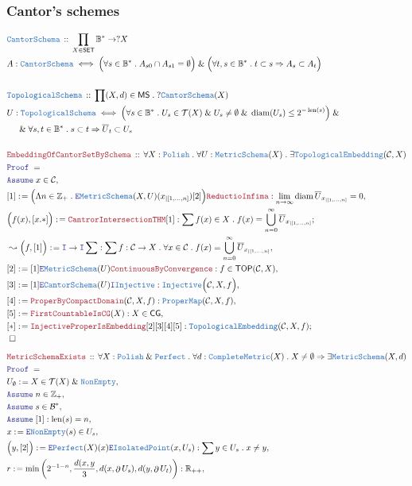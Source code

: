 \documentclass[12pt]{scrartcl}
\newcommand{\TYPE}[1]{\textcolor{NavyBlue}{\mathtt{#1}}}
\newcommand{\LOGIC}[1]{\textcolor{Blue}{\mathtt{#1}}}
\newcommand{\THM}[1]{\textcolor{Maroon}{\mathtt{#1}}}
\renewcommand{\.}{\; . \;}
\newcommand{\de}{: \kern 0.1pc =}
\newcommand{\Theorem}[2]{& \THM{#1} \, :: \, #2 \\ & \Proof = \\ }
\newcommand{\DeclareType}[2]{& \TYPE{#1} \, :: \, #2 \\}
\newcommand{\DefineType}[3]{& #1 : \TYPE{#2} \iff #3 \\}
\newcommand{\NewLine}{\\ & \kern 1pc}
\newcommand{\Page}[1]{ \begin{align*} #1 \end{align*}   }
\renewcommand{\And}{\; \& \;}
\newcommand{\Imply}{\Rightarrow}
\newcommand{\Intro}{\LOGIC{I}}
\newcommand{\Elim}{\LOGIC{E}}
\newcommand{\Int}{\mathbb{Z} }
\newcommand{\Reals}{\mathbb{R} }
\newcommand{\Say}[3]{& #1 \de #2 : #3, \\}
\newcommand{\SayIn}[3]{& #1 \de #2 \in #3, \\}
\newcommand{\Conclude}[3]{& #1 \de #2 : #3; \\}
\newcommand{\Derive}[3]{& \leadsto #1 \de #2 : #3, \\}
\newcommand{\Assume}[2]{& \LOGIC{Assume} \; #1 : #2, \\}
\newcommand{\AssumeIn}[2]{& \LOGIC{Assume} \; #1 \in #2, \\}
\newcommand{\QED}{\; \square}
\newcommand{\EndProof}{& \QED \\}
\newcommand{\Proof}{\LOGIC{Proof} \; }
\newcommand{\C}{\mathcal{C}}
\newcommand{\B}{\mathcal{B}}
\newcommand{\SET}{\mathsf{SET}}
\newcommand{\Perfect}{\TYPE{Perfect}}
\DeclareMathOperator*{\boundary}{\partial}
\newcommand{\TOP}{\mathsf{TOP}}
\newcommand{\CG}{\mathsf{CG}}
\newcommand{\T}{\mathcal{T}}
\DeclareMathOperator{\diam}{diam}
\newcommand{\MS}{\mathsf{MS}}
\newcommand{\Bool}{\mathbb{B}}
\newcommand{\FS}[1]{{#1}{}^*}
\newcommand{\Polish}{\TYPE{Polish}}
\DeclareMathOperator{\len}{len}
\newcommand{\inits}[2]{{#1}_{|\left[1,\ldots,#2\right]}}
\begin{document}
\subsubsection{Cantor's schemes}
\Page{
	\DeclareType{CantorSchema}{\prod_{X \in \SET} \FS{\Bool} \to ?X}
	\DefineType{A}{CantorSchema}{ \Big(\forall s \in \FS{\Bool} \. 
		A_{s0} \cap A_{s1} = \emptyset\Big) 
		\And   
		\Big(\forall t,s \in \FS{\Bool} \. t \subset s \Imply A_{s} \subset A_{t}\Big)
	}
	\\
	\DeclareType{TopologicalSchema}{\prod (X,d) \in \MS \. ?\TYPE{CantorSchema}(X)}
	\DefineType{U}{TopologicalSchema}
	{
		\Big(
			\forall s \in \FS{\Bool} \.
			U_s \in \T(X) \And U_s \neq \emptyset
			\And  \diam(U_s) \le 2^{-\len(s)} 
		\Big)
		\And
		\NewLine
		\And
		\forall s,t \in \FS{\Bool} \.
		s \subset t \Imply 
		\overline{U}_t \subset U_s
	}
	\\
	\Theorem{EmbeddingOfCantorSetBySchema}
	{
		\forall X : \Polish \.
		\forall U : \TYPE{MetricSchema}(X) \.
		\exists \TYPE{TopologicalEmbedding}(\C,X)
	}
	\AssumeIn{x}{\C}
	\Say{[1]}{
		\Big(
			\Lambda n \in \Int_+ \. 
			\Elim \TYPE{MetricSchema}(X,U)(\inits{x}{n})[2] 
		\Big)
		\THM{ReductioInfima}
	}
	{
		\lim_{n \to \infty} \diam \overline{U}_{\inits{x}{n}} = 0
	}
	\Conclude{\Big(f(x),[x.*]\Big)}{\THM{CantrorIntersectionTHM}[1]}  
	{
		\sum f(x) \in X \. f(x) = \bigcup^\infty_{n=0} \overline{U}_{\inits{x}{n}}
	}
	\Derive{\Big(f,[1]\Big)}{\Intro\to\Intro \sum}
	{
		\sum f : \C \to X \. 
		\forall x \in \C \.  
		f(x) = \bigcup^\infty_{n=0} \overline{U}_{\inits{x}{n}}
	}
	\Say{[2]}{[1] \Elim \TYPE{MetricSchema}(U)\THM{ContinuousByConvergence}}
	{
		f \in \TOP(\C,X)
	}
	\Say{[3]}{[1] \Elim \TYPE{CantorSchema}(U)\Intro \TYPE{Injective}}
	{
		\TYPE{Injective}\Big(\C,X, f\Big)
	}
	\Say{[4]}{\THM{ProperByCompactDomain}(\C,X,f)}{\TYPE{ProperMap}(\C,X,f)}
	\Say{[5]}{\THM{FirstCountableIsCG}(X)}{X \in \CG}
	\Conclude{[*]}{\THM{InjectiveProperIsEmbedding}[2][3][4][5]}
	{
		\TYPE{TopologicalEmbedding}(\C,X,f)
	}
	\EndProof
}\Page{
	\Theorem{MetricSchemaExists}
	{
		\forall X : \Polish \And \Perfect \.
		\forall d : \TYPE{CompleteMetric}(X) \.
		X \neq \emptyset
		\Imply
		\exists \TYPE{MetricSchema}(X,d)
	}
	\SayIn{U_\emptyset}{X}{\T(X) \And \TYPE{NonEmpty}}
	\AssumeIn{n}{\Int_+}
	\AssumeIn{s}{\FS{\B}}
	\Assume{[1]}{\len(s) = n}
	\SayIn{x}{\Elim \TYPE{NonEmpty}(s)}{U_s}
	\Say{\Big(y,[2]\Big)}{\Elim \Perfect(X)(x)\Elim \TYPE{IsolatedPoint}(x,U_s)}
	{
			\sum y \in U_s \. x \neq y
	}
	\Say{r}{\min\left(2^{-1-n},\frac{d(x,y}{3},d(x,\boundary U_s),d(y,\boundary U_t)\right)}{\Reals_{++}}
}
\end{document}
